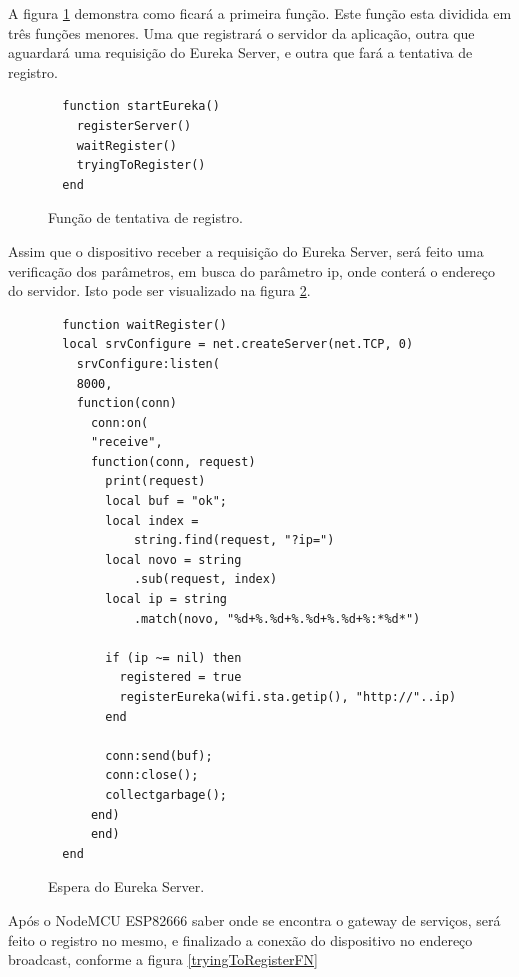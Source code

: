 \documentclass[journal]{IEEEtran}
\begin{document}
A figura \ref{functtentregistroeureka} demonstra como ficará a primeira função. Este função esta dividida em três funções menores. Uma que registrará o servidor da aplicação, outra que aguardará uma requisição do Eureka Server, e  outra que fará a tentativa de registro.

\begin{figure}[H]
\centering

\begin{lstlisting}
  function startEureka()
    registerServer()
    waitRegister()
    tryingToRegister()
  end
\end{lstlisting}
\caption{Função de tentativa de registro.}
\label{functtentregistroeureka}
\end{figure}
  
Assim que o dispositivo receber a requisição do Eureka Server, será feito uma verificação dos parâmetros, em busca do parâmetro ip, onde conterá o endereço do servidor. Isto pode ser visualizado na figura \ref{waitRegisterFN}.

\begin{figure}[H]
\centering

\begin{lstlisting}
  function waitRegister()
  local srvConfigure = net.createServer(net.TCP, 0)
    srvConfigure:listen(
    8000,
    function(conn)
      conn:on(
      "receive",
      function(conn, request)
        print(request)
        local buf = "ok";
        local index = 
            string.find(request, "?ip=")
        local novo = string
            .sub(request, index)
        local ip = string
            .match(novo, "%d+%.%d+%.%d+%.%d+%:*%d*")

        if (ip ~= nil) then
          registered = true
          registerEureka(wifi.sta.getip(), "http://"..ip)
        end

        conn:send(buf);
        conn:close();
        collectgarbage();
      end)
      end)
  end
\end{lstlisting}
\caption{Espera do Eureka Server.}
\label{waitRegisterFN}
\end{figure}

Após o NodeMCU ESP82666 saber onde se encontra o gateway de serviços, será feito o registro no mesmo, e finalizado a conexão do dispositivo no endereço broadcast, conforme a figura \ref{tryingToRegisterFN}
\end{document}
